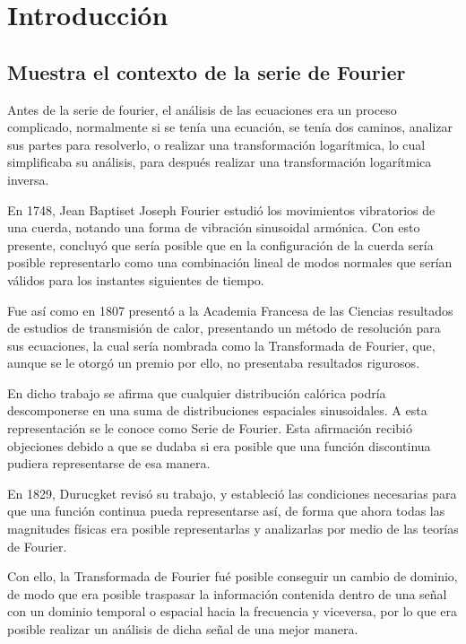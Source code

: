 
\section{Introducción}

\subsection{Muestra el contexto de la serie de Fourier}

Antes de la serie de fourier, el análisis de las ecuaciones era un proceso complicado, normalmente si se tenía una ecuación, se tenía dos caminos, analizar sus partes para resolverlo, o realizar una transformación logarítmica, lo cual simplificaba su análisis, para después realizar una transformación logarítmica inversa.

En 1748, Jean Baptiset Joseph Fourier estudió los movimientos vibratorios de una cuerda, notando una forma de vibración sinusoidal armónica. Con esto presente, concluyó que sería posible que en la configuración de la cuerda sería posible representarlo como una combinación lineal de modos normales que serían válidos para los instantes siguientes de tiempo.

Fue así como en 1807 presentó a la Academia Francesa de las Ciencias resultados de estudios de transmisión de calor, presentando un método de resolución para sus ecuaciones, la cual sería nombrada como la Transformada de Fourier, que, aunque se le otorgó un premio por ello, no presentaba resultados rigurosos.

En dicho trabajo se afirma que cualquier distribución calórica podría descomponerse en una suma de distribuciones espaciales sinusoidales. A esta representación se le conoce como Serie de Fourier. Esta afirmación recibió objeciones debido a que se dudaba si era posible que una función discontinua pudiera representarse de esa manera.

En 1829, Durucgket revisó su trabajo, y estableció las condiciones necesarias para que una función continua pueda representarse así, de forma que ahora todas las magnitudes físicas era posible representarlas y analizarlas por medio de las teorías de Fourier.

Con ello, la Transformada de Fourier fué posible conseguir un cambio de dominio, de modo que era posible traspasar la información contenida dentro de una señal con un dominio temporal o espacial hacia la frecuencia y viceversa, por lo que era posible realizar un análisis de dicha señal de una mejor manera.

